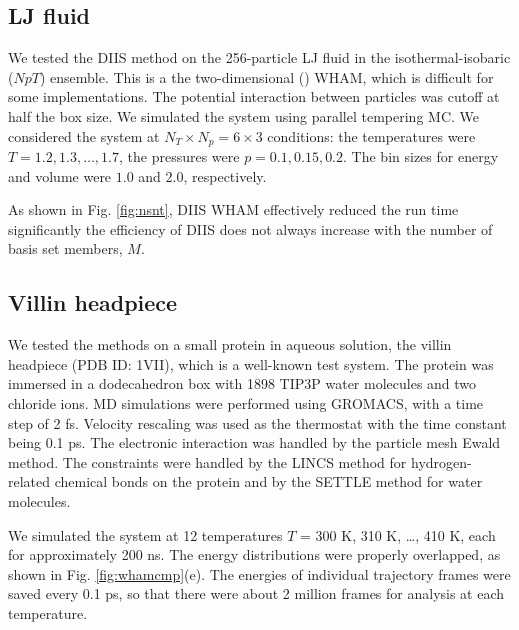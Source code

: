 \documentclass{gMOS2e}
\begin{document}
\subsection{\label{sec:results_LJ}
LJ fluid}


We tested the DIIS method
on the 256-particle LJ fluid in the isothermal-isobaric ($NpT$) ensemble.
%
This is a the two-dimensional () WHAM,
which is difficult for some implementations.
%
The potential interaction between particles was cutoff at half the box size.
%
We simulated the system 
using parallel tempering MC.
%
We considered the system
at $N_T \times N_p = 6\times 3$ conditions:
the temperatures were $T = 1.2, 1.3, \dots, 1.7$,
the pressures were $p = 0.1, 0.15, 0.2$.
%
The bin sizes for energy and volume
were $1.0$ and $2.0$, respectively.



As shown in Fig. \ref{fig:nsnt},
DIIS WHAM effectively
reduced the run time significantly
the efficiency of DIIS does not
always increase with
the number of basis set members, $M$.




\subsection{\label{sec:results_villin}
Villin headpiece}



We tested the methods on a small protein in aqueous solution,
the villin headpiece
(PDB ID: 1VII), which is a well-known test system\cite{duan1998}.
%
The protein was immersed in
a dodecahedron box with 1898 TIP3P water molecules and two chloride ions.
%
MD simulations were performed
using GROMACS\cite{
berendsen1995, lindahl2001, vanderspoel2005, hess2008},
with a time step of 2 fs.
%
Velocity rescaling\cite{bussi2007}
was used as the thermostat with
the time constant being 0.1 ps.
%
The electronic interaction was
handled by the particle mesh Ewald method\cite{
essmann1995}.
%
The constraints were handled by the LINCS method\cite{
hess1997}
for hydrogen-related chemical bonds on the protein
and by the SETTLE method\cite{
miyamoto1992}
for water molecules.
%



We simulated the system at 12 temperatures
$T$ = 300 K, 310 K, \dots, 410 K,
each for approximately 200 ns.
%
The energy distributions were properly overlapped,
as shown in Fig. \ref{fig:whamcmp}(e).
%
The energies of individual trajectory frames were saved every 0.1 ps,
so that there were about 2 million frames for analysis
at each temperature.
\end{document}
